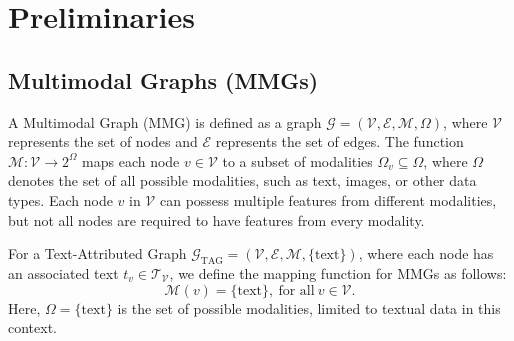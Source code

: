 \section{Preliminaries}
\subsection{Multimodal Graphs (MMGs)}
\begin{definition}
\label{def:multimodal_graphs}
A Multimodal Graph (MMG) is defined as a graph \( \mathcal{G} = (\mathcal{V}, \mathcal{E}, \mathcal{M}, \Omega) \), where \( \mathcal{V} \) represents the set of nodes and \( \mathcal{E} \) represents the set of edges. The function \( \mathcal{M} : \mathcal{V} \rightarrow 2^{\Omega} \) maps each node \( v \in \mathcal{V} \) to a subset of modalities \( \Omega_v \subseteq \Omega \), where \( \Omega \) denotes the set of all possible modalities, such as text, images, or other data types. Each node \( v \) in \( \mathcal{V} \) can possess multiple features from different modalities, but not all nodes are required to have features from every modality. 
\end{definition}
For a Text-Attributed Graph \( \mathcal{G}_{\text{TAG}} = (\mathcal{V}, \mathcal{E}, \mathcal{M}, \{\text{text}\}) \), where each node has an associated text \( t_v \in \mathcal{T}_\mathcal{V} \), we define the mapping function for MMGs as follows:
\begin{equation} 
\mathcal{M}(v) = \{\text{text}\}, \ \text{for all}\ v \in \mathcal{V}.
\end{equation}
Here, \( \Omega = \{\text{text}\} \) is the set of possible modalities, limited to textual data in this context.





